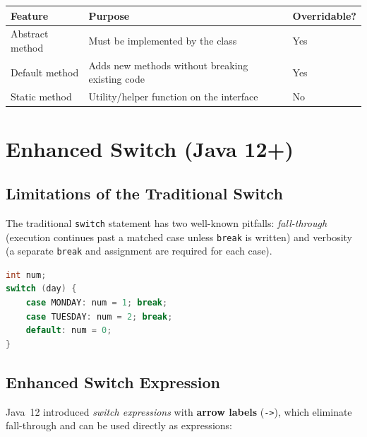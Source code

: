 \documentclass[11pt, a4paper, notitlepage]{report}
\theoremstyle{definition}
\theoremstyle{remark}
\theoremstyle{definition}
\begin{document}
\begin{keyresult}[title={Key Result: Interface Method Types (Java 8+)}]
\begin{center}
\begin{tabularx}{\linewidth}{lXl}
\toprule
\textbf{Feature}  & \textbf{Purpose} & \textbf{Overridable?} \\
\midrule
Abstract method   & Must be implemented by the class             & Yes \\
Default method    & Adds new methods without breaking existing code & Yes \\
Static method     & Utility/helper function on the interface     & No  \\
\bottomrule
\end{tabularx}
\end{center}
\end{keyresult}

\section{Enhanced Switch (Java 12+)}
\label{sec:ch10-switch}

\subsection{Limitations of the Traditional Switch}
\label{subsec:ch10-switch-traditional}

The traditional \texttt{switch} statement has two well-known pitfalls:
\emph{fall-through} (execution continues past a matched case unless \texttt{break} is
written) and verbosity (a separate \texttt{break} and assignment are required for each
case).

\begin{lstlisting}[language=Java]
int num;
switch (day) {
    case MONDAY: num = 1; break;
    case TUESDAY: num = 2; break;
    default: num = 0;
}
\end{lstlisting}

\subsection{Enhanced Switch Expression}
\label{subsec:ch10-switch-enhanced}

Java~12 introduced \emph{switch expressions} with \textbf{arrow labels} (\texttt{->}),
which eliminate fall-through and can be used directly as expressions:
\end{document}
